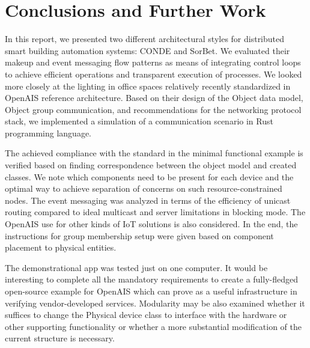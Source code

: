 \documentclass[11pt, english, a4paper, twoside]{article}
\begin{document}
\section{Conclusions and Further Work} \label{conclusion}
In this report, we presented two different architectural styles for distributed smart building automation systems: CONDE and SorBet. We evaluated their makeup and event messaging flow patterns as means of integrating control loops to achieve efficient operations and transparent execution of processes. We looked more closely at the lighting in office spaces relatively recently standardized in OpenAIS reference architecture. Based on their design of the Object data model, Object group communication, and recommendations for the networking protocol stack, we implemented a simulation of a communication scenario in Rust programming language. 

The achieved compliance with the standard in the minimal functional example is verified based on finding correspondence between the object model and created classes. We note which components need to be present for each device and the optimal way to achieve separation of concerns on such resource-constrained nodes. The event messaging was analyzed in terms of the efficiency of unicast routing compared to ideal multicast and server limitations in blocking mode. The OpenAIS use for other kinds of IoT solutions is also considered. In the end, the instructions for group membership setup were given based on component placement to physical entities.

The demonstrational app was tested just on one computer. It would be interesting to complete all the mandatory requirements to create a fully-fledged open-source example for OpenAIS which can prove as a useful infrastructure in verifying vendor-developed services. Modularity may be also examined whether it suffices to change the Physical device class to interface with the hardware or other supporting functionality or whether a more substantial modification of the current structure is necessary. 
 
\printbibliography
\end{document}

